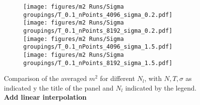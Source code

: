 \begin{figure}[p]
	\hspace{-2cm}
	\begin{subfigure}{1.3\textwidth}
	\texttt{[image: figures/m2 Runs/Sigma groupings/T\_0.1\_nPoints\_4096\_sigma\_0.2.pdf]}
	\texttt{[image: figures/m2 Runs/Sigma groupings/T\_0.1\_nPoints\_8192\_sigma\_0.2.pdf]}
	\texttt{[image: figures/m2 Runs/Sigma groupings/T\_0.1\_nPoints\_4096\_sigma\_1.5.pdf]}
	\texttt{[image: figures/m2 Runs/Sigma groupings/T\_0.1\_nPoints\_8192\_sigma\_1.5.pdf]}
	\end{subfigure}
	\caption{Comparison of the averaged $m^2$ for different $N_l$, with $N, T, \sigma$ as indicated y the title of the panel and $N_l$ indicated by the legend. \textbf{Add linear interpolation}}
	\label{fig:m2-comparison}
\end{figure}
